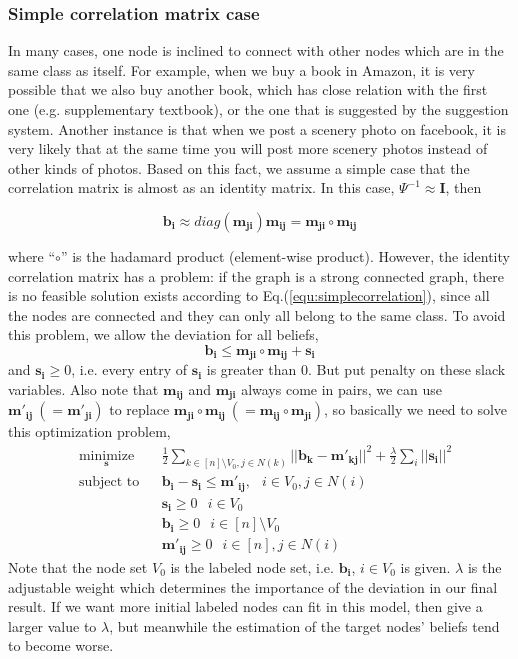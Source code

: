 \subsubsection{Simple correlation matrix case}

In many cases, one node is inclined to connect with other nodes which are in the same class as itself. For example, when we buy a book in Amazon, it is very possible that we also buy another book, which has close relation with the first one (e.g. supplementary textbook), or the one that is suggested by the suggestion system. Another instance is that when we post a scenery photo on facebook, it is very likely that at the same time you will post more scenery photos instead of other kinds of photos. Based on this fact, we assume a simple case that the correlation matrix is almost as an identity matrix. In this case, $\Psi^{-1} \approx \mathbf{I}$, then

\begin{equation}
\label{equ:simplecorrelation}
\mathbf{b_i} \approx diag(\mathbf{m_{ji}})\mathbf{m_{ij}} = \mathbf{m_{ji}}\circ \mathbf{m_{ij}}
\end{equation}

where ``$\circ$'' is the hadamard product (element-wise product). However, the identity correlation matrix has a problem: if the graph is a strong connected graph, there is no feasible solution exists according to Eq.(\ref{equ:simplecorrelation}), since all the nodes are connected and they can only all belong to the same class. To avoid this problem, we allow the deviation for all beliefs,
$$\mathbf{b_i}  \leq \mathbf{m_{ji}}\circ \mathbf{m_{ij}} + \mathbf{s_i}$$
and $\mathbf{s_i} \geq 0$, i.e. every entry of $\mathbf{s_i}$ is greater than $0$. But put penalty on these slack variables. Also note that $\mathbf{m_{ij}}$ and $\mathbf{m_{ji}}$ always come in pairs, we can use $\mathbf{m'_{ij}} ~(= \mathbf{m'_{ji}})$ to replace $\mathbf{m_{ji}}\circ \mathbf{m_{ij}} ~(= \mathbf{m_{ij}}\circ \mathbf{m_{ji}})$, so basically we need to solve this optimization problem,
\begin{equation}
\begin{aligned}
& \underset{\mathbf{s}}{\text{minimize}}
& & \frac{1}{2}\mathop{\sum}_{k \in [n]\setminus V_0, j\in N(k)}||\mathbf{b_k} - \mathbf{m'_{kj}}||^2 + \frac{\lambda}{2}\sum_i||\mathbf{s_i}||^2 \\
& \text{subject to}
& &  \mathbf{b_i}-\mathbf{s_i} \leq \mathbf{m'_{ij}}, ~~\; i \in V_0, j\in N(i)\\
& &  &\mathbf{s_i}\geq 0 ~~\; i \in V_0\\
& &  &\mathbf{b_i}\geq 0 ~~\; i \in [n]\setminus V_0\\
& &  &\mathbf{m'_{ij}}\geq 0 ~~\; i \in [n], j\in N(i)
\end{aligned}
\end{equation}
Note that the node set $V_0$ is the labeled node set, i.e. $\mathbf{b_i}$, $i\in V_0$ is given. $\lambda$ is the adjustable weight which determines the importance of the deviation in our final result. If we want more initial labeled nodes can fit in this model, then give a larger value to $\lambda$, but meanwhile the estimation of the target nodes' beliefs tend to become worse.

